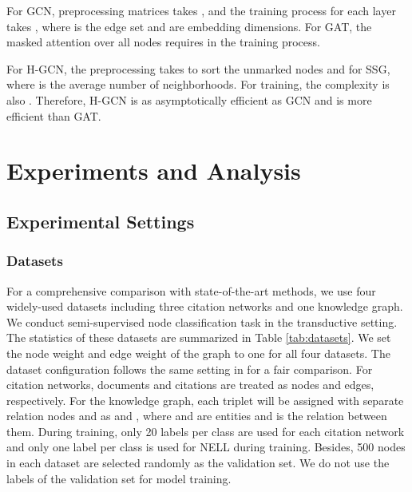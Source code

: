 \documentclass{article}
\begin{document}
For GCN, preprocessing matrices  takes , and the training process for each layer takes , where  is the edge set and  are embedding dimensions. For GAT, the masked attention over all nodes requires  in the training process.

For H-GCN, the preprocessing takes  to sort the unmarked nodes and  for SSG, where  is the average number of neighborhoods. For training, the complexity is also . Therefore, H-GCN is as asymptotically efficient as GCN and is more efficient than GAT.
 \section{Experiments and Analysis}



\subsection{Experimental Settings}

\subsubsection{Datasets}

For a comprehensive comparison with state-of-the-art methods, we use four widely-used datasets including three citation networks and one knowledge graph. We conduct semi-supervised node classification task in the transductive setting. The statistics of these datasets are summarized in Table \ref{tab:datasets}. We set the node weight and edge weight of the graph to one for all four datasets. The dataset configuration follows the same setting in \cite{pmlr-v48-yanga16,Kipf:2016tc} for a fair comparison. For citation networks, documents and citations are treated as nodes and edges, respectively. For the knowledge graph, each triplet  will be assigned with separate relation nodes  and  as  and , where  and  are entities and  is the relation between them. During training, only 20 labels per class are used for each citation network and only one label per class is used for NELL during training. Besides, 500 nodes in each dataset are selected randomly as the validation set. We do not use the labels of the validation set for model training.
\end{document}
